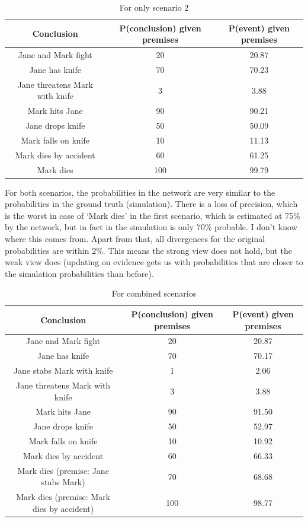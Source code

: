 \begin{enumerate}
\begin{table}
\begin{tabular}{|c|c|c|}
 \hline
 Conclusion &P(conclusion) given premises & P(event) given premises\\
 \hline
 Jane and Mark fight   & 20 &  20.87   \\
 Jane has knife & 70 & 70.23 \\
 Jane threatens Mark with knife & 3 & 3.88 \\
 Mark hits Jane & 90 & 90.21 \\
 Jane drops knife & 50 & 50.09 \\
 Mark falls on knife & 10 & 11.13\\
 Mark dies by accident & 60 & 61.25 \\
 Mark dies & 100 & 99.79 \\ 
\hline
\end{tabular}
\caption{For only scenario 2}
\end{table}

For both scenarios, the probabilities in the network are very similar to the probabilities in the ground truth (simulation). There is a
loss of precision, which is the worst in case of `Mark dies' in the first scenario, which is estimated at 75\% by the network, but in fact in the simulation is only 70\% probable. I don't know where this comes from. Apart from that, all divergences for the original probabilities are within 2\%. This means the strong view does not hold, but the weak view does (updating on evidence gets us with probabilities that are closer to the simulation probabilities than before).


\begin{table}
\begin{tabular}{|c|c|c|}
 \hline
 Conclusion &P(conclusion) given premises & P(event) given premises\\
 \hline
 Jane and Mark fight   & 20 &  20.87   \\
 Jane has knife & 70 & 70.17 \\
 Jane stabs Mark with knife & 1 & 2.06 \\
 Jane threatens Mark with knife & 3 & 3.88 \\
 Mark hits Jane & 90 & 91.50 \\
 Jane drops knife & 50 & 52.97 \\
 Mark falls on knife & 10 & 10.92\\
 Mark dies by accident & 60 & 66.33 \\
 Mark dies (premise: Jane stabs Mark) & 70 & 68.68 \\ 
  Mark dies (premise: Mark dies by accident)& 100 & 98.77 \\ 
\hline
\end{tabular}
\caption{For combined scenarios}
\end{table}


\end{enumerate}
